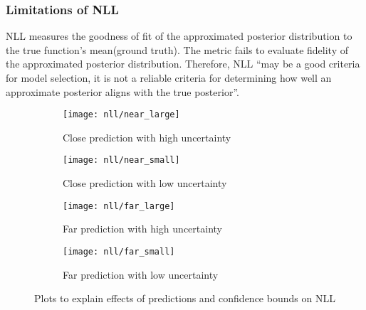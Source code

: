 \subsubsection{Limitations of NLL}
NLL measures the goodness of fit of the approximated posterior distribution to the true function's mean(ground truth). The metric fails to evaluate fidelity of the approximated posterior distribution. Therefore, NLL \enquote{may be a good criteria for model
selection, it is not a reliable criteria for determining how well an approximate posterior aligns with the true posterior}\cite{yao2019quality}. 
\begin{figure}[H]
\centering
\begin{subfigure}[b]{0.3\textwidth}
	\centering
	\texttt{[image: nll/near\_large]}
	\caption{Close prediction with high uncertainty}
	\label{fig_1d_functions_nll0}
\end{subfigure}
\hfill
\begin{subfigure}[b]{0.3\textwidth}
	\centering
	\texttt{[image: nll/near\_small]}
	\caption{Close prediction with low uncertainty}
	\label{fig_1d_functions_nll1}
\end{subfigure}
\hfill
\begin{subfigure}[b]{0.3\textwidth}
	\centering
	\texttt{[image: nll/far\_large]}
	\caption{Far prediction with high uncertainty}
	\label{fig_1d_functions_nll2}
\end{subfigure}
\hfill
\begin{subfigure}[b]{0.3\textwidth}
	\centering
	\texttt{[image: nll/far\_small]}
	\caption{Far prediction with low uncertainty}
	\label{fig_1d_functions_nll3}
\end{subfigure}
\hfill
\caption{Plots to explain effects of predictions and confidence bounds on NLL }
\label{fig_1d_functions_nll}
\end{figure}
